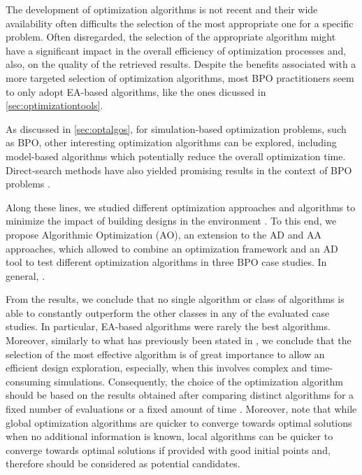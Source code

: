 The development of optimization algorithms is not recent and their wide availability often difficults the selection of the most appropriate one for a specific problem. Often disregarded, the selection of the appropriate algorithm might have a significant impact in the overall efficiency of optimization processes and, also, on the quality of the retrieved results\cite{Wolpert1997NFLT}. Despite the benefits associated with a more targeted selection of optimization algorithms, most \ac{BPO} practitioners seem to only adopt \ac{EA}-based algorithms, like the ones dicussed in \cref{sec:optimizationtools}. 

As discussed in \cref{sec:optalgos}, for simulation-based optimization problems, such as \ac{BPO}, other interesting optimization algorithms can be explored, including model-based algorithms which potentially reduce the overall optimization time\cite{Wortmann2017GABESTCHOICE}. Direct-search methods have also yielded promising results in the context of \ac{BPO} problems \cite{Waibel2018}. 

Along these lines, we studied different optimization approaches and algorithms to minimize the impact of building designs in the environment  \cite{Caetano2018,Belem2018optimizeddesign,Belem2019MOO}. To this end, we propose Algorithmic Optimization (\ac{AO}), an extension to the \ac{AD} and \ac{AA} approaches, which allowed to combine an optimization framework and an \ac{AD} tool to test different optimization algorithms in three \ac{BPO} case studies. In general, .


From the results, we conclude that no single algorithm or class of algorithms is able to constantly outperform the other classes in any of the evaluated case studies. In particular, \ac{EA}-based algorithms were rarely the best algorithms. Moreover, similarly to what has previously been stated in \cite{Wortmann2016BBO}, we conclude that the selection of the most effective algorithm is of great importance to allow an efficient design exploration, especially, when this involves complex and time-consuming simulations. Consequently, the choice of the optimization algorithm should be based on the results obtained after comparing distinct algorithms for a fixed number of evaluations or a fixed amount of time \cite{Hamdy2016}. Moreover, note that while global optimization algorithms are quicker to converge towards optimal solutions when no additional information is known, local algorithms can be quicker to converge towards optimal solutions if provided with good initial points and, therefore should be considered as potential candidates. 
 
